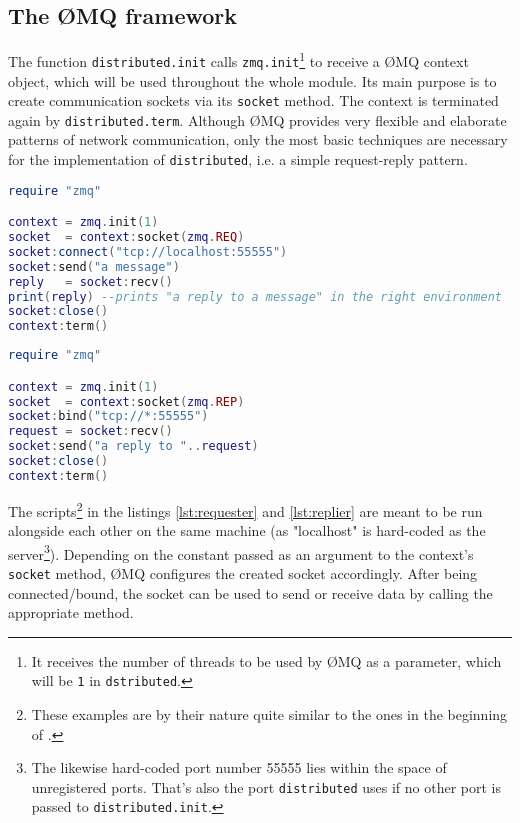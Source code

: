 \subsection{The \O MQ framework}
\label{sec:messages:zeromq}

The function \texttt{distributed.init} calls \texttt{zmq.init}\footnote{It receives the number of threads to be used by \O MQ as a parameter, which will be \texttt{1} in \texttt{dstributed}.} to receive a \O MQ context object, which will be used throughout the whole module. Its main purpose is to create communication sockets via its \texttt{socket} method. The context is terminated again by \texttt{distributed.term}. Although \O MQ provides very flexible and elaborate patterns of network communication, only the most basic techniques are necessary for the implementation of \texttt{distributed}, i.e. a simple request-reply pattern.

\begin{lstlisting}[language=lua, caption={Example of the \emph{request} side of a communication via \O MQ}, label=lst:requester, name=lst:requester]
require "zmq"

context = zmq.init(1)
socket  = context:socket(zmq.REQ)
socket:connect("tcp://localhost:55555")
socket:send("a message")
reply   = socket:recv()
print(reply) --prints "a reply to a message" in the right environment
socket:close()
context:term()
\end{lstlisting}

\begin{lstlisting}[language=lua, caption={Example of the \emph{reply} side of a communication via \O MQ}, label=lst:replier, name=lst:repler]
require "zmq"

context = zmq.init(1)
socket  = context:socket(zmq.REP)
socket:bind("tcp://*:55555")
request = socket:recv()
socket:send("a reply to "..request)
socket:close()
context:term()
\end{lstlisting}

The scripts\footnote{These examples are by their nature quite similar to the ones in the beginning of \cite{ZeroMQ}.} in the listings \ref{lst:requester} and \ref{lst:replier} are meant to be run alongside each other on the same machine (as "localhost" is hard-coded as the server\footnote{The likewise hard-coded port number 55555 lies within the space of unregistered ports. That's also the port \texttt{distributed} uses if no other port is passed to \texttt{distributed.init}.}). Depending on the constant passed as an argument to the context's \texttt{socket} method, \O MQ configures the created socket accordingly. After being connected/bound, the socket can be used to send or receive data by calling the appropriate method.

